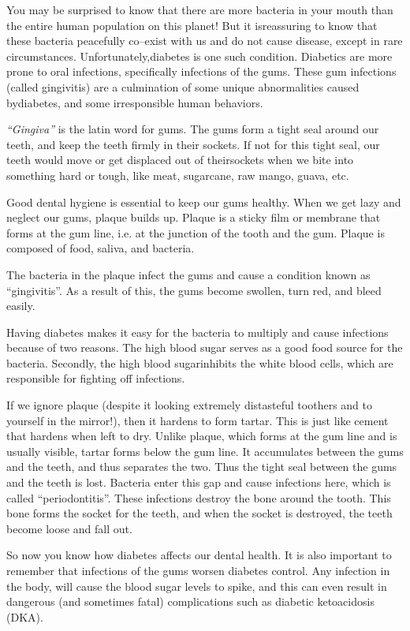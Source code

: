 You may be surprised to know that there are more bacteria in your mouth than the entire human population on this planet! But it is\break reassuring to know that these bacteria peacefully co–exist with us and do not cause disease, except in rare circumstances. Unfortunately,\break diabetes is one such condition. Diabetics are more prone to oral infe\-ctions, specifically infections of the gums. These gum infections (called gingivitis) are a culmination of some unique abnormalities caused by\break diabetes, and some irresponsible human behaviors.

\textit{“Gingiva”} is the latin word for gums. The gums form a tight seal around our teeth, and keep the teeth firmly in their sockets. If not for this tight seal, our teeth would move or get displaced out of their\break sockets when we bite into something hard or tough, like meat, sugarcane, raw mango, guava, etc.

Good dental hygiene is essential to keep our gums healthy. When we get lazy and neglect our gums, plaque builds up. Plaque is a sticky film or membrane that forms at the gum line, i.e. at the junction of the tooth and the gum. Plaque is composed of food, saliva, and bacteria.

The bacteria in the plaque infect the gums and cause a condition known as “gingivitis”. As a result of this, the gums become swollen, turn red, and bleed easily.

Having diabetes makes it easy for the bacteria to multiply and cause infections because of two reasons. The high blood sugar serves as a good food source for the bacteria. Secondly, the high blood sugar\break inhibits the white blood cells, which are responsible for fighting off infections.

If we ignore plaque (despite it looking extremely distasteful to\break others and to yourself in the mirror!), then it hardens to form tartar. This is just like cement that hardens when left to dry. Unlike plaque, which forms at the gum line and is usually visible, tartar forms below the gum line. It accumulates between the gums and the teeth, and thus separates the two. Thus the tight seal between the gums and the teeth is lost. Bacteria enter this gap and cause infections here, which is called “periodontitis”. These infections destroy the bone around the tooth. This bone forms the socket for the teeth, and when the socket is destroyed, the teeth become loose and fall out.

So now you know how diabetes affects our dental health. It is also important to remember that infections of the gums worsen diabetes control. Any infection in the body, will cause the blood sugar levels to spike, and this can even result in dangerous (and sometimes fatal) complications such as diabetic ketoacidosis (DKA).

